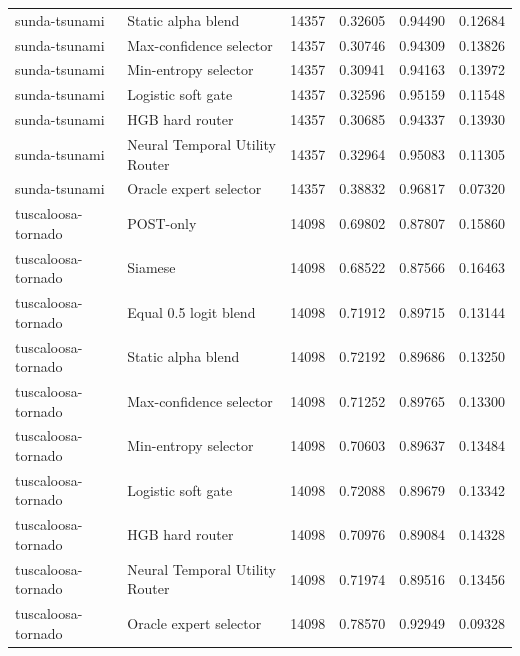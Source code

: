 \begin{tabular}{llrrrr}
sunda-tsunami & Static alpha blend & 14357 & 0.32605 & 0.94490 & 0.12684 \\
sunda-tsunami & Max-confidence selector & 14357 & 0.30746 & 0.94309 & 0.13826 \\
sunda-tsunami & Min-entropy selector & 14357 & 0.30941 & 0.94163 & 0.13972 \\
sunda-tsunami & Logistic soft gate & 14357 & 0.32596 & 0.95159 & 0.11548 \\
sunda-tsunami & HGB hard router & 14357 & 0.30685 & 0.94337 & 0.13930 \\
sunda-tsunami & Neural Temporal Utility Router & 14357 & 0.32964 & 0.95083 & 0.11305 \\
sunda-tsunami & Oracle expert selector & 14357 & 0.38832 & 0.96817 & 0.07320 \\
tuscaloosa-tornado & POST-only & 14098 & 0.69802 & 0.87807 & 0.15860 \\
tuscaloosa-tornado & Siamese & 14098 & 0.68522 & 0.87566 & 0.16463 \\
tuscaloosa-tornado & Equal 0.5 logit blend & 14098 & 0.71912 & 0.89715 & 0.13144 \\
tuscaloosa-tornado & Static alpha blend & 14098 & 0.72192 & 0.89686 & 0.13250 \\
tuscaloosa-tornado & Max-confidence selector & 14098 & 0.71252 & 0.89765 & 0.13300 \\
tuscaloosa-tornado & Min-entropy selector & 14098 & 0.70603 & 0.89637 & 0.13484 \\
tuscaloosa-tornado & Logistic soft gate & 14098 & 0.72088 & 0.89679 & 0.13342 \\
tuscaloosa-tornado & HGB hard router & 14098 & 0.70976 & 0.89084 & 0.14328 \\
tuscaloosa-tornado & Neural Temporal Utility Router & 14098 & 0.71974 & 0.89516 & 0.13456 \\
tuscaloosa-tornado & Oracle expert selector & 14098 & 0.78570 & 0.92949 & 0.09328 \\
\bottomrule
\end{tabular}
